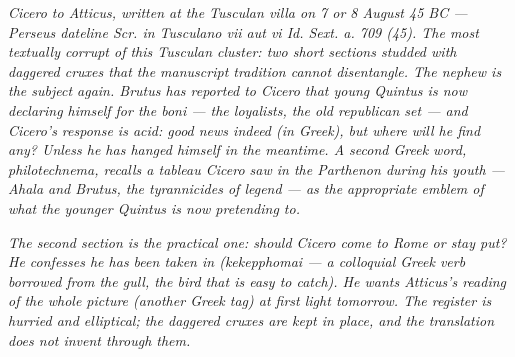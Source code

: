 
\textit{Cicero to Atticus, written at the Tusculan villa on 7 or 8
August 45 BC --- Perseus dateline \textit{Scr. in Tusculano vii
aut vi Id. Sext. a. 709 (45)}. The most textually corrupt of
this Tusculan cluster: two short sections studded with daggered
cruxes that the manuscript tradition cannot disentangle. The
nephew is the subject again. Brutus has reported to Cicero that
young Quintus is now declaring himself for the \textit{boni} ---
the loyalists, the old republican set --- and Cicero's response
is acid: \textit{good news indeed} (in Greek), but where will he
find any? Unless he has hanged himself in the meantime. A second
Greek word, \textit{philotechnema}, recalls a tableau Cicero saw
in the Parthenon during his youth --- Ahala and Brutus, the
tyrannicides of legend --- as the appropriate emblem of what the
younger Quintus is now pretending to.}

\textit{The second section is the practical one: should Cicero
come to Rome or stay put? He confesses he has been
\textit{taken in} (\textit{kekepphomai} --- a colloquial
Greek verb borrowed from the gull, the bird that is easy to
catch). He wants Atticus's reading of \textit{the whole
picture} (another Greek tag) at first light tomorrow. The
register is hurried and elliptical; the daggered cruxes are
kept in place, and the translation does not invent through
them.}
